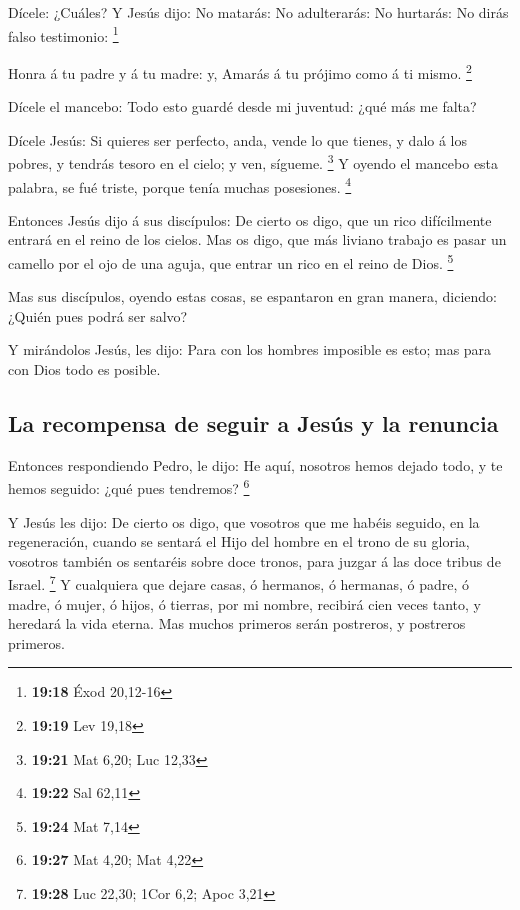  Dícele: ¿Cuáles? Y Jesús dijo: No matarás: No
adulterarás: No hurtarás: No dirás falso testimonio: \footnote{\textbf{19:18}
  Éxod 20,12-16}

 Honra á tu padre y á tu madre: y, Amarás á tu prójimo
como á ti mismo. \footnote{\textbf{19:19} Lev 19,18}

 Dícele el mancebo: Todo esto guardé desde mi juventud:
¿qué más me falta?

 Dícele Jesús: Si quieres ser perfecto, anda, vende lo
que tienes, y dalo á los pobres, y tendrás tesoro en el cielo; y ven,
sígueme. \footnote{\textbf{19:21} Mat 6,20; Luc 12,33}  Y
oyendo el mancebo esta palabra, se fué triste, porque tenía muchas
posesiones. \footnote{\textbf{19:22} Sal 62,11}

 Entonces Jesús dijo á sus discípulos: De cierto os digo,
que un rico difícilmente entrará en el reino de los cielos.
 Mas os digo, que más liviano trabajo es pasar un camello
por el ojo de una aguja, que entrar un rico en el reino de Dios.
\footnote{\textbf{19:24} Mat 7,14}

 Mas sus discípulos, oyendo estas cosas, se espantaron en
gran manera, diciendo: ¿Quién pues podrá ser salvo?

 Y mirándolos Jesús, les dijo: Para con los hombres
imposible es esto; mas para con Dios todo es posible.

\hypertarget{la-recompensa-de-seguir-a-jesuxfas-y-la-renuncia}{%
\subsection{La recompensa de seguir a Jesús y la
renuncia}\label{la-recompensa-de-seguir-a-jesuxfas-y-la-renuncia}}

 Entonces respondiendo Pedro, le dijo: He aquí, nosotros
hemos dejado todo, y te hemos seguido: ¿qué pues tendremos? \footnote{\textbf{19:27}
  Mat 4,20; Mat 4,22}

 Y Jesús les dijo: De cierto os digo, que vosotros que me
habéis seguido, en la regeneración, cuando se sentará el Hijo del hombre
en el trono de su gloria, vosotros también os sentaréis sobre doce
tronos, para juzgar á las doce tribus de Israel. \footnote{\textbf{19:28}
  Luc 22,30; 1Cor 6,2; Apoc 3,21}  Y cualquiera que
dejare casas, ó hermanos, ó hermanas, ó padre, ó madre, ó mujer, ó
hijos, ó tierras, por mi nombre, recibirá cien veces tanto, y heredará
la vida eterna.  Mas muchos primeros serán postreros, y
postreros primeros.

